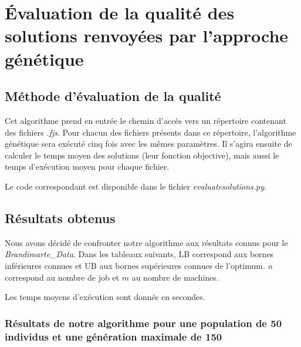 \section{Évaluation de la qualité des solutions renvoyées par l'approche génétique}

\subsection{Méthode d'évaluation de la qualité}

Cet algorithme prend en entrée le chemin d'accès vers un répertoire contenant des fichiers \textit{.fjs}. Pour chacun des fichiers présents dans ce répertoire, l'algorithme génétique sera exécuté cinq fois avec les mêmes paramètres. Il s'agira ensuite de calculer le temps moyen des solutions (leur fonction objective), mais aussi le temps d'exécution moyen pour chaque fichier.

Le code correspondant est disponible dans le fichier \textit{evaluatesolutions.py}.

\subsection{Résultats obtenus}

Nous avons décidé de confronter notre algorithme aux résultats connus pour le \textit{Brandimarte\_Data}. Dans les tableaux suivants, LB correspond aux bornes inférieures connues et UB aux bornes supérieures connues de l'optimum. $n$ correspond au nombre de job et $m$ au nombre de machines.

Les temps moyens d'exécution sont donnés en secondes.

\subsubsection{Résultats de notre algorithme pour une population de 50 individus et une génération maximale de 150}

